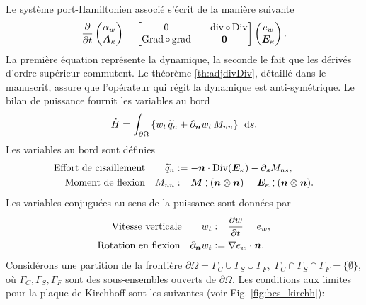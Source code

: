 Le système port-Hamiltonien associé s'écrit de la manière suivante
\begin{equation*}
\diffp{}{t}
\begin{pmatrix}
\alpha_w \\
\bm{A}_{\kappa} \\
\end{pmatrix} = 
\begin{bmatrix}
0  &  - \div \circ \Div \\
\Grad \circ \grad & \bm{0} \\
\end{bmatrix}
\begin{pmatrix}
e_w \\
\bm{E}_{\kappa} \\
\end{pmatrix}.
\end{equation*}
La première équation représente la dynamique, la seconde le fait que les dérivés d'ordre supérieur commutent. Le théorème \ref{th:adjdivDiv}, détaillé dans le manuscrit, assure que l'opérateur qui régit la dynamique est anti-symétrique. Le bilan de puissance fournit les variables au bord
\begin{equation*}
\dot{H} = \int_{\partial \Omega} \left\{ w_t \, \widetilde{q}_n + \partial_{\bm{n}}{w_t} \, M_{nn}\right\} \, \d{s}.
\end{equation*} 
Les variables au bord sont définies 
\begin{equation*}
	\begin{aligned}
	\text{Effort de cisaillement}  \qquad \widetilde{q}_{n} &:= - \bm{n} \cdot \mathrm{Div}(\bm{E}_{\kappa}) - \partial_{\bm{s}}{M_{ns}}, \\
	\text{Moment de flexion} \quad M_{nn} &:=  \bm{M} \cddot (\bm{n}\otimes{\bm{n}}) = \bm{E}_{\kappa} \cddot (\bm{n}\otimes{\bm{n}}).
	\end{aligned}
\end{equation*}
Les variables conjuguées au sens de la puissance sont données par
\begin{equation*}
	\begin{aligned}
	\text{Vitesse verticale}  \qquad w_t &:= \diffp{w}{t} = e_w, \\
	\text{Rotation en flexion} \quad 
	\partial_{\bm{n}}{w_t} &:= \nabla{e_w} \cdot \bm{n}.
	\end{aligned}
\end{equation*}
Considérons une partition de la frontière $ \partial \Omega = \overline{\Gamma}_{C} \cup \overline{\Gamma}_{S} \cup \overline {\Gamma}_{F}, \; {\Gamma}_{C} \cap {\Gamma}_{S} \cap {\Gamma}_{F} = \{\emptyset\} $, où $ {\Gamma}_{C}, {\Gamma}_{S}, {\Gamma}_{F} $ sont des sous-ensembles ouverts de $\partial \Omega $. Les conditions aux limites pour la plaque de Kirchhoff \cite{gustafsson2018} sont les suivantes (voir Fig. \ref{fig:bcs_kirchh}):

